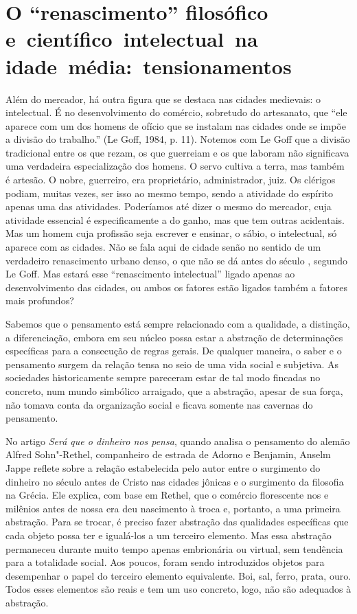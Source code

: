 \section*{O ``renascimento'' filosófico e~científico~intelectual~na idade~média:~tensionamentos}

Além do mercador, há outra figura que se destaca nas cidades medievais:
o intelectual. É no desenvolvimento do comércio, sobretudo do
artesanato, que ``ele aparece com um dos homens de ofício que se
instalam nas cidades onde se impõe a divisão do trabalho.'' (Le Goff,
1984, p. 11). Notemos com Le Goff que a divisão tradicional entre os que
rezam, os que guerreiam e os que laboram não significava uma verdadeira
especialização dos homens. O servo cultiva a terra, mas também é
artesão. O nobre, guerreiro, era proprietário, administrador, juiz. Os
clérigos podiam, muitas vezes, ser isso ao mesmo tempo, sendo a
atividade do espírito apenas uma das atividades. Poderíamos até dizer
o mesmo do mercador, cuja atividade essencial
é especificamente a do ganho, mas que tem outras acidentais. Mas um
homem cuja profissão seja escrever e ensinar, o sábio, o intelectual, só
aparece com as cidades. Não se fala aqui de cidade senão no sentido de
um verdadeiro renascimento urbano denso, o que não se dá antes do século
, segundo Le Goff. Mas estará esse ``renascimento intelectual''
ligado apenas ao desenvolvimento das cidades, ou ambos os fatores estão
ligados também a fatores mais profundos?

Sabemos que o pensamento está sempre relacionado com a qualidade, a
distinção, a diferenciação, embora em seu núcleo possa estar a abstração
de determinações específicas para a consecução de regras gerais. De
qualquer maneira, o saber e o pensamento surgem da relação tensa no seio
de uma vida social e subjetiva. As sociedades historicamente sempre
pareceram estar de tal modo fincadas no concreto, num mundo simbólico
arraigado, que a abstração, apesar de sua força, não tomava conta da
organização social e ficava somente nas cavernas do pensamento.

No artigo \emph{Será que o dinheiro nos pensa}, quando analisa o
pensamento do alemão Alfred Sohn"-Rethel, companheiro de estrada de
Adorno e Benjamin, Anselm Jappe reflete sobre a relação estabelecida
pelo autor entre o surgimento do dinheiro no século  antes de Cristo
nas cidades jônicas e o surgimento da filosofia na Grécia. Ele explica,
com base em Rethel, que o comércio florescente nos  e  milênios
antes de nossa era deu nascimento à troca e, portanto, a uma primeira
abstração. Para se trocar, é preciso fazer abstração das qualidades
específicas que cada objeto possa ter e igualá-los a um terceiro
elemento. Mas essa abstração permaneceu durante muito tempo apenas
embrionária ou virtual, sem tendência para a totalidade social. Aos
poucos, foram sendo introduzidos objetos para desempenhar o papel do
terceiro elemento equivalente. Boi, sal, ferro, prata, ouro. Todos esses
elementos são reais e tem um uso concreto, logo, não são adequados à
abstração.

